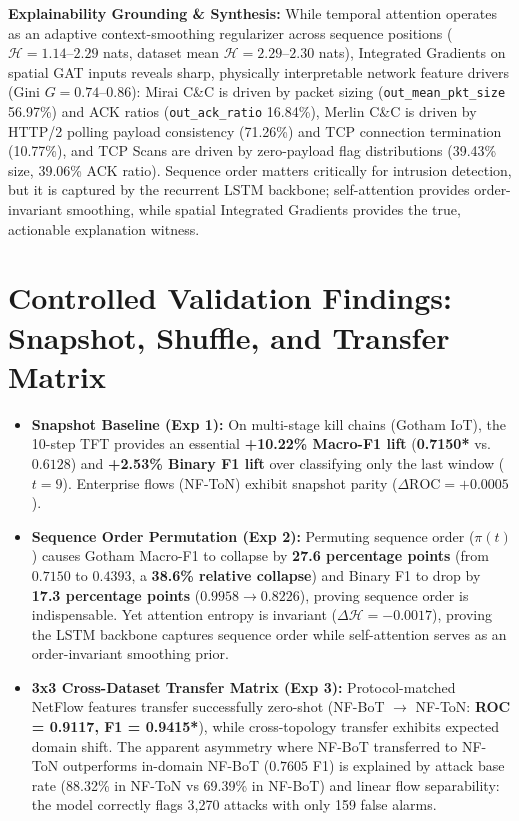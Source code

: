 \documentclass[10pt,a4paper]{article}
\newcommand{\best}[1]{\textbf{\textcolor{bestgreen}{#1*}}}
\begin{document}
\noindent\textbf{Explainability Grounding \& Synthesis:} While temporal attention operates as an adaptive context-smoothing regularizer across sequence positions ($\mathcal{H} = 1.14\text{--}2.29$ nats, dataset mean $\mathcal{H} = 2.29\text{--}2.30$ nats), Integrated Gradients on spatial GAT inputs reveals sharp, physically interpretable network feature drivers (Gini $G = 0.74\text{--}0.86$): Mirai C\&C is driven by packet sizing (\texttt{out\_mean\_pkt\_size} 56.97\%) and ACK ratios (\texttt{out\_ack\_ratio} 16.84\%), Merlin C\&C is driven by HTTP/2 polling payload consistency (71.26\%) and TCP connection termination (10.77\%), and TCP Scans are driven by zero-payload flag distributions (39.43\% size, 39.06\% ACK ratio). Sequence order matters critically for intrusion detection, but it is captured by the recurrent LSTM backbone; self-attention provides order-invariant smoothing, while spatial Integrated Gradients provides the true, actionable explanation witness.

\section{Controlled Validation Findings: Snapshot, Shuffle, and Transfer Matrix}
\begin{itemize}[leftmargin=*]
    \item \textbf{Snapshot Baseline (Exp 1):} On multi-stage kill chains (Gotham IoT), the 10-step TFT provides an essential \textbf{+10.22\% Macro-F1 lift} (\best{0.7150} vs. $0.6128$) and \textbf{+2.53\% Binary F1 lift} over classifying only the last window ($t=9$). Enterprise flows (NF-ToN) exhibit snapshot parity ($\Delta\text{ROC} = +0.0005$).
    \item \textbf{Sequence Order Permutation (Exp 2):} Permuting sequence order ($\pi(t)$) causes Gotham Macro-F1 to collapse by \textbf{27.6 percentage points} (from $0.7150$ to $0.4393$, a \textbf{38.6\% relative collapse}) and Binary F1 to drop by \textbf{17.3 percentage points} ($0.9958 \to 0.8226$), proving sequence order is indispensable. Yet attention entropy is invariant ($\Delta\mathcal{H} = -0.0017$), proving the LSTM backbone captures sequence order while self-attention serves as an order-invariant smoothing prior.
    \item \textbf{3x3 Cross-Dataset Transfer Matrix (Exp 3):} Protocol-matched NetFlow features transfer successfully zero-shot (NF-BoT $\to$ NF-ToN: \best{ROC = 0.9117, F1 = 0.9415}), while cross-topology transfer exhibits expected domain shift. The apparent asymmetry where NF-BoT transferred to NF-ToN outperforms in-domain NF-BoT ($0.7605$ F1) is explained by attack base rate (88.32\% in NF-ToN vs 69.39\% in NF-BoT) and linear flow separability: the model correctly flags 3,270 attacks with only 159 false alarms.
\end{itemize}
\end{document}
